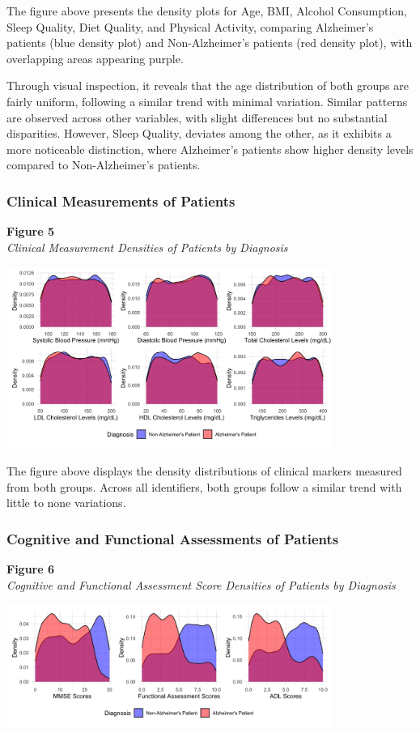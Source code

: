 \documentclass[12pt]{article}
\begin{document}
The figure above presents the density plots for Age, BMI, Alcohol Consumption, Sleep Quality, Diet Quality, and Physical Activity, comparing Alzheimer's patients (blue density plot) and Non-Alzheimer's patients (red density plot), 
with overlapping areas appearing purple. 

Through visual inspection, it reveals that the age distribution of both groups are fairly uniform, following a similar trend with minimal variation. Similar patterns are observed across other variables, 
with slight differences but no substantial disparities. However, Sleep Quality, deviates among the other, as it exhibits a more noticeable distinction, where Alzheimer's patients show higher density levels compared to Non-Alzheimer's patients. 

\subsubsection{Clinical Measurements of Patients}
\noindent
\textbf{Figure 5}\\
\textit{Clinical Measurement Densities of Patients by Diagnosis}
\begin{center}
    \includegraphics[width = 0.8\textwidth]{Clinical Measures Distribution.png}
\end{center}

The figure above displays the density distributions of clinical markers measured from both groups. Across all identifiers, both groups follow a similar trend with little to none variations. 

\subsubsection{Cognitive and Functional Assessments of Patients}
\noindent
\textbf{Figure 6}\\
\textit{Cognitive and Functional Assessment Score Densities of Patients by Diagnosis}
\begin{center}
    \includegraphics[width = 0.8\textwidth]{Cognitive and Functional Distributions.png}
\end{center}
\end{document}
